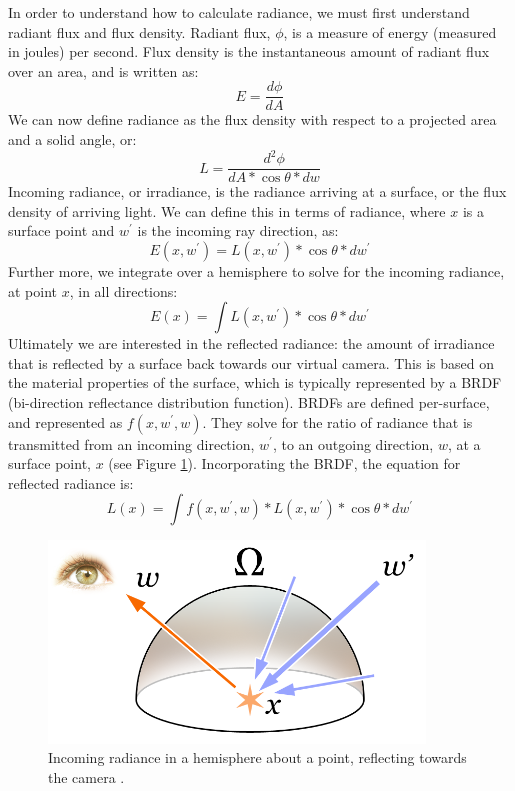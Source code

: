 In order to understand how to calculate radiance, we must first understand radiant flux and flux density. Radiant flux, $\phi$, is a measure of energy (measured in joules) per second. Flux density is the instantaneous amount of radiant flux over an area, and is written as:
\begin{equation}
E = \frac{d\phi}{dA}
\label{eqn:flux_density}
\end{equation}
We can now define radiance as the flux density with respect to a projected area and a solid angle, or:
\begin{equation}
L = \frac{d^{2}\phi}{dA*\cos\theta*dw}
\label{eqn:radiance}
\end{equation}
Incoming radiance, or irradiance, is the radiance arriving at a surface, or the flux density of arriving light. We can define this in terms of radiance, where $x$ is a surface point and $w^{\prime}$ is the incoming ray direction, as:
\begin{equation}
E(x,w^{\prime}) = L(x,w^{\prime}) * \cos\theta * dw^{\prime}
\label{eqn:irradiance}
\end{equation}
Further more, we integrate over a hemisphere to solve for the incoming radiance, at point $x$, in all directions:
\begin{equation}
E(x) = \int L(x,w^{\prime}) * \cos\theta * dw^{\prime}
\label{eqn:irradiance_integral}
\end{equation}
Ultimately we are interested in the reflected radiance: the amount of irradiance that is reflected by a surface back towards our virtual camera. This is based on the material properties of the surface, which is typically represented by a BRDF (bi-direction reflectance distribution function). BRDFs are defined per-surface, and represented as $f(x, w^{\prime}, w)$. They solve for the ratio of radiance that is transmitted from an incoming direction, $w^{\prime}$, to an outgoing direction, $w$, at a surface point, $x$ (see Figure \ref{fig:incoming_radiance}). Incorporating the BRDF, the equation for reflected radiance is:
\begin{equation}
L(x) = \int f(x, w^{\prime}, w) * L(x,w^{\prime}) * \cos\theta * dw^{\prime}
\label{eqn:radiance_integral}
\end{equation}

\begin{figure}
   \centering
   \includegraphics[width=100mm]{../img/rendering-equation-image.png}
   \captionfonts
   \caption[Incoming radiance hemisphere]{Incoming radiance in a hemisphere about a point, reflecting towards the camera \cite{bib:nikishin_radiance}.}
   \label{fig:incoming_radiance}
\end{figure}

